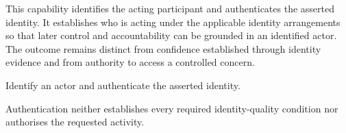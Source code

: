 This capability identifies the acting participant and authenticates the asserted identity. It establishes who is acting under the applicable identity arrangements so that later control and accountability can be grounded in an identified actor. The outcome remains distinct from confidence established through identity evidence and from authority to access a controlled concern.



Identify an actor and authenticate the asserted identity.



Authentication neither establishes every required identity-quality condition nor authorises the requested activity.


